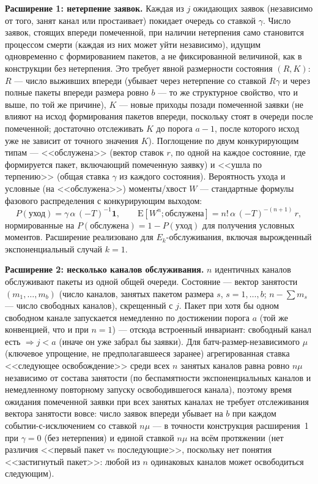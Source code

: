 \documentclass[12pt,a4paper]{article}
\begin{document}
\noindent\textbf{Расширение 1: нетерпение заявок.} Каждая из $j$ ожидающих заявок (независимо от того, занят канал или простаивает) покидает очередь со ставкой $\gamma$. Число заявок, стоящих впереди помеченной, при наличии нетерпения само становится процессом смерти (каждая из них может уйти независимо), идущим одновременно с формированием пакетов, а не фиксированной величиной, как в конструкции без нетерпения. Это требует явной размерности состояния $(R,K)$: $R$ --- число выживших впереди (убывает через нетерпение со ставкой $R\gamma$ и через полные пакеты впереди размера ровно $b$ --- то же структурное свойство, что и выше, по той же причине), $K$ --- новые приходы позади помеченной заявки (не влияют на исход формирования пакетов впереди, поскольку стоят в очереди после помеченной; достаточно отслеживать $K$ до порога $a-1$, после которого исход уже не зависит от точного значения $K$). Поглощение по двум конкурирующим типам --- <<обслужена>> (вектор ставок $r$, по одной на каждое состояние, где формируется пакет, включающий помеченную заявку) и <<ушла по терпению>> (общая ставка $\gamma$ из каждого состояния). Вероятность ухода и условные (на <<обслужена>>) моменты/хвост $W$ --- стандартные формулы фазового распределения с конкурирующим выходом:
\begin{equation}
P(\text{уход}) = \gamma\,\alpha\,(-T)^{-1}\mathbf{1}, \qquad
\mathrm{E}[W^n;\text{обслужена}] = n!\,\alpha\,(-T)^{-(n+1)}\,r,
\label{eq:abandonment}
\end{equation}
нормированные на $P(\text{обслужена})=1-P(\text{уход})$ для получения условных моментов. Расширение реализовано для $E_k$-обслуживания, включая вырожденный экспоненциальный случай $k=1$.

\noindent\textbf{Расширение 2: несколько каналов обслуживания.} $n$ идентичных каналов обслуживают пакеты из одной общей очереди. Состояние --- вектор занятости $(m_1,\dots,m_b)$ (число каналов, занятых пакетом размера $s$, $s=1,\dots,b$; $n-\sum m_s$ --- число свободных каналов), скрещенный с $j$. Пакет при хотя бы одном свободном канале запускается немедленно по достижении порога $a$ (той же конвенцией, что и при $n=1$) --- отсюда встроенный инвариант: свободный канал есть $\Rightarrow j<a$ (иначе он уже забрал бы заявки). Для батч-размер-независимого $\mu$ (ключевое упрощение, не предполагавшееся заранее) агрегированная ставка <<следующее освобождение>> среди всех $n$ занятых каналов равна ровно $n\mu$ независимо от состава занятости (по беспамятности экспоненциальных каналов и немедленному повторному запуску освободившегося канала), поэтому время ожидания помеченной заявки при всех занятых каналах не требует отслеживания вектора занятости вовсе: число заявок впереди убывает на $b$ при каждом событии-с-исключением со ставкой $n\mu$ --- в точности конструкция расширения~1 при $\gamma=0$ (без нетерпения) и единой ставкой $n\mu$ на всём протяжении (нет различия <<первый пакет vs последующие>>, поскольку нет понятия <<застигнутый пакет>>: любой из $n$ одинаковых каналов может освободиться следующим).
\end{document}
